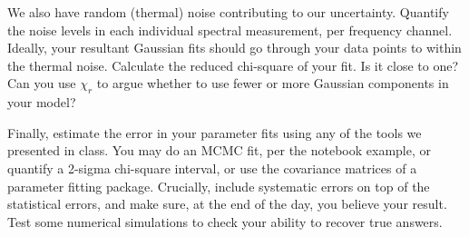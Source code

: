 \documentclass[11pt,preprint]{aastex}
\begin{document}
We also have random (thermal) noise contributing to our uncertainty.
Quantify the noise levels in each individual spectral measurement, per frequency
channel. Ideally, your resultant Gaussian fits should go through your
data points to within the thermal noise. Calculate the reduced chi-square
of your fit. Is it close to one? Can you use $\chi_r$ to argue whether
to use fewer or more Gaussian components in your model?

Finally, estimate the error in your parameter fits using any of the tools
we presented in class. You may do an MCMC fit, per the notebook example,
or quantify a 2-sigma chi-square interval, or use the covariance matrices
of a parameter fitting package. Crucially, include systematic errors on
top of the statistical errors, and make sure, at the end of the day, you believe
your result. Test some numerical simulations to check
your ability to recover true answers.
\end{document}
